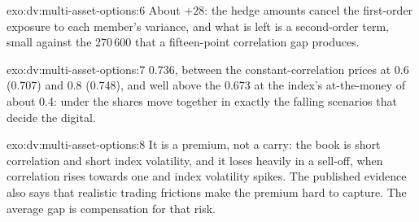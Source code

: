 \begin{solution}{exo:dv:multi-asset-options:6}
About $+28$: the hedge amounts cancel the first-order exposure to each member's variance, and what is left is a second-order
term, small against the 270\,600 that a fifteen-point correlation gap produces.
\end{solution}

\begin{solution}{exo:dv:multi-asset-options:7}
0.736, between the constant-correlation prices at 0.6 (0.707) and 0.8 (0.748), and well above the 0.673 at the index's
at-the-money  of about 0.4: under  the shares move together in exactly the falling
scenarios that decide the digital.
\end{solution}

\begin{solution}{exo:dv:multi-asset-options:8}
It is a premium, not a carry: the book is short correlation and short index volatility, and it loses heavily in a sell-off,
when correlation rises towards one and index volatility spikes. The published evidence also says that realistic trading
frictions make the premium hard to capture. The average gap is compensation for that risk.
\end{solution}

